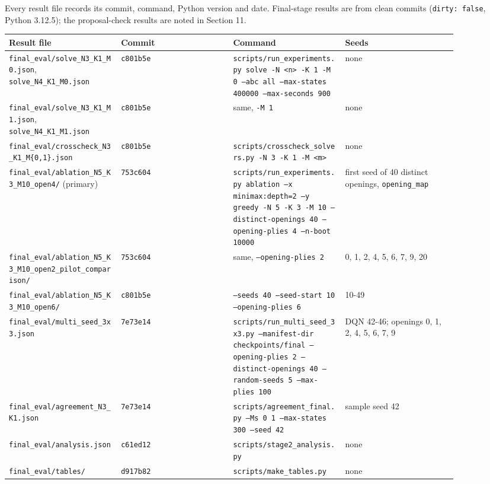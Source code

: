 \documentclass[11pt]{article}
\begin{document}
Every result file records its commit, command, Python version and date. Final-stage results are
from clean commits (\texttt{dirty: false}, Python 3.12.5); the proposal-check results are noted in
Section 11.

\begin{center}\scriptsize
\begin{longtable}{p{0.22\linewidth}p{0.22\linewidth}p{0.22\linewidth}p{0.22\linewidth}}
\toprule
Result file & Commit & Command & Seeds \\
\midrule
\texttt{final\_eval/solve\_N3\_K1\_M0.json}, \texttt{solve\_N4\_K1\_M0.json} & \texttt{c801b5e} & \texttt{scripts/run\_experiments.py solve -N <n> -K 1 -M 0 --abc all --max-states 400000 --max-seconds 900} & none \\
\texttt{final\_eval/solve\_N3\_K1\_M1.json}, \texttt{solve\_N4\_K1\_M1.json} & \texttt{c801b5e} & same, \texttt{-M 1} & none \\
\texttt{final\_eval/crosscheck\_N3\_K1\_M\{0,1\}.json} & \texttt{c801b5e} & \texttt{scripts/crosscheck\_solvers.py -N 3 -K 1 -M <m>} & none \\
\texttt{final\_eval/ablation\_N5\_K3\_M10\_open4/} (primary) & \texttt{753c604} & \texttt{scripts/run\_experiments.py ablation --x minimax:depth=2 --y greedy -N 5 -K 3 -M 10 --distinct-openings 40 --opening-plies 4 --n-boot 10000} & first seed of 40 distinct openings, \texttt{opening\_map} \\
\texttt{final\_eval/ablation\_N5\_K3\_M10\_open2\_pilot\_comparison/} & \texttt{753c604} & same, \texttt{--opening-plies 2} & 0, 1, 2, 4, 5, 6, 7, 9, 20 \\
\texttt{final\_eval/ablation\_N5\_K3\_M10\_open6/} & \texttt{c801b5e} & \texttt{--seeds 40 --seed-start 10 --opening-plies 6} & 10-49 \\
\texttt{final\_eval/multi\_seed\_3x3.json} & \texttt{7e73e14} & \texttt{scripts/run\_multi\_seed\_3x3.py --manifest-dir checkpoints/final --opening-plies 2 --distinct-openings 40 --random-seeds 5 --max-plies 100} & DQN 42-46; openings 0, 1, 2, 4, 5, 6, 7, 9 \\
\texttt{final\_eval/agreement\_N3\_K1.json} & \texttt{7e73e14} & \texttt{scripts/agreement\_final.py --Ms 0 1 --max-states 300 --seed 42} & sample seed 42 \\
\texttt{final\_eval/analysis.json} & \texttt{c61ed12} & \texttt{scripts/stage2\_analysis.py} & none \\
\texttt{final\_eval/tables/} & \texttt{d917b82} & \texttt{scripts/make\_tables.py} & none \\

\end{longtable}
\end{center}
\end{document}
